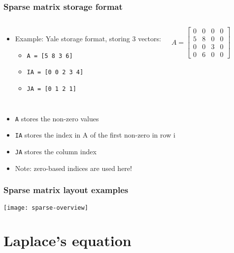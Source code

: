\begin{frame}[fragile]
  \frametitle{Sparse matrix storage format}
  \begin{columns}
  \begin{itemize}
    \item Example: Yale storage format, storing 3 vectors:
    \begin{itemize}
      \item \lstinline$A = [5 8 3 6]$
      \item \lstinline$IA = [0 0 2 3 4]$
      \item \lstinline$JA = [0 1 2 1]$
    \end{itemize}
  \end{itemize}
  \[
   A = 
   \begin{bmatrix}
    0 & 0 & 0 & 0\\
    5 & 8 & 0 & 0\\
    0 & 0 & 3 & 0\\
    0 & 6 & 0 & 0
    \end{bmatrix}
  \]
  \end{columns}
  \begin{itemize}
    \item \lstinline$A$ stores the non-zero values
    \item \lstinline$IA$ stores the index in A of the first non-zero in row i
    \item \lstinline$JA$ stores the column index
    \item Note: zero-based indices are used here!
\end{itemize}
\end{frame}

\begin{frame}[fragile]
  \frametitle{Sparse matrix layout examples}
  \begin{center}
   \texttt{[image: sparse-overview]}
  \end{center}
\end{frame}

\section{Laplace's equation}
